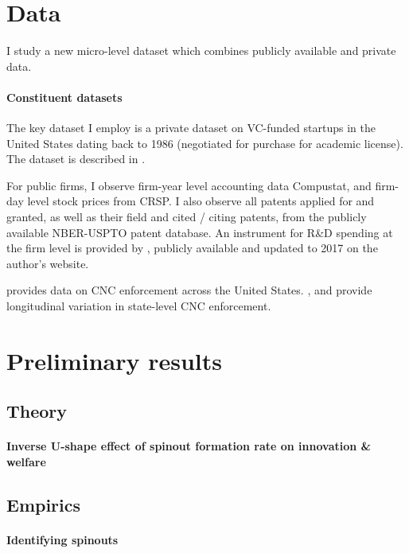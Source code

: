 \documentclass[11pt,english]{article}
\theoremstyle{remark}
\begin{document}
\section{Data}

I study a new micro-level dataset which combines publicly available and private data. 

\paragraph{Constituent datasets}

The key dataset I employ is a private dataset on VC-funded startups in the United States dating back to 1986 (negotiated for purchase for academic license). The dataset is described in \cite{kaplan_how_2002}. 

For public firms, I observe firm-year level accounting data Compustat, and firm-day level stock prices from CRSP. I also observe all patents applied for and granted, as well as their field and cited / citing patents, from the publicly available NBER-USPTO patent database. An instrument for R\&D spending at the firm level is provided by \cite{bloom_identifying_2013}, publicly available and updated to 2017 on the author's website.

\cite{starr_noncompetes_2019} provides data on CNC enforcement across the United States. \cite{marx_mobility_2009}, and \cite{jeffers_impact_2018} provide longitudinal variation in state-level CNC enforcement. 

\section{Preliminary results}

\subsection{Theory}

\paragraph{Inverse U-shape effect of spinout formation rate on innovation \& welfare}

\subsection{Empirics}

\paragraph{Identifying spinouts}
\end{document}
